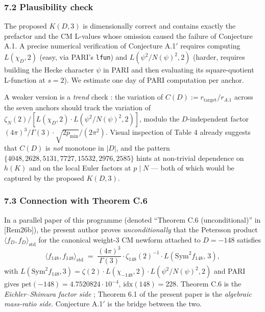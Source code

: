 \documentclass[
  11pt,
  a4paper,
]{amsart}
\begin{document}
\hypertarget{plausibility-check}{%
\subsubsection{7.2 Plausibility check}\label{plausibility-check}}

The proposed \(K(D, 3)\) is dimensionally correct and contains exactly the prefactor and the CM L-values whose omission caused the failure of Conjecture A.1. A precise numerical verification of Conjecture A.1\('\) requires computing \(L(\chi_D, 2)\) (easy, via PARI's \texttt{lfun}) and \(L(\psi^{2}/N(\psi)^{2}, 2)\) (harder, requires building the Hecke character \(\psi\) in PARI and then evaluating its square-quotient L-function at \(s = 2\)). We estimate one day of PARI computation per anchor.

A weaker version is a \emph{trend} check : the variation of \(C(D) := r_{\mathrm{target}}/r_{A.1}\) across the seven anchors should track the variation of \(\zeta_N(2) / [L(\chi_D, 2)\cdot L(\psi^{2}/N(\psi)^{2}, 2)]\), modulo the \(D\)-independent factor \((4\pi)^{3}/\Gamma(3)\cdot \sqrt{2 p_{\min}}/(2\pi^{2})\). Visual inspection of Table 4 already suggests that \(C(D)\) is \emph{not} monotone in \(|D|\), and the pattern \(\{4048, 2628, 5131, 7727, 15532, 2976, 2585\}\) hints at non-trivial dependence on \(h(K)\) and on the local Euler factors at \(p\mid N\) --- both of which would be captured by the proposed \(K(D, 3)\).

\hypertarget{connection-with-theorem-c.6}{%
\subsubsection{7.3 Connection with Theorem C.6}\label{connection-with-theorem-c.6}}

In a parallel paper of this programme (denoted ``Theorem C.6 (unconditional)'' in {[}Rem26b{]}), the present author proves \emph{unconditionally} that the Petersson product \(\langle f_D, f_D\rangle_{\mathrm{std}}\) for the canonical weight-3 CM newform attached to \(D = -148\) satisfies
\[
\langle f_{148}, f_{148}\rangle_{\mathrm{std}} \;=\; \frac{(4\pi)^{3}}{\Gamma(3)}\cdot \zeta_{148}(2)^{-1}\cdot L(\mathrm{Sym}^{2} f_{148},\, 3),
\]
with \(L(\mathrm{Sym}^{2} f_{148}, 3) = \zeta(2)\cdot L(\chi_{-148}, 2)\cdot L(\psi^{2}/N(\psi)^{2}, 2)\) and PARI gives \(\mathrm{pet}(-148) = 4.7520824\cdot 10^{-4}\), \(\mathrm{idx}(148) = 228\). Theorem C.6 is the \emph{Eichler--Shimura factor side} ; Theorem 6.1 of the present paper is the \emph{algebraic mass-ratio side}. Conjecture A.1\('\) is the bridge between the two.
\end{document}
